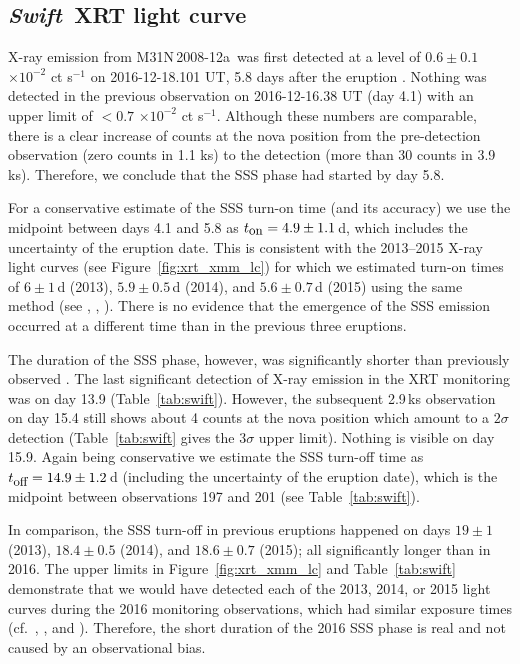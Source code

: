 \documentclass[twocolumn,tighten]{aastex6}
\def\swift{{\it Swift~}}
\def\novak{{M31N\,2008-12a}}
\newcommand{\cts}[1]{$\times 10^{#1}$ ct s$^{-1}$}
\newcommand{\eton}{t_{\mbox{\small{on}}}}
\newcommand{\etoff}{t_{\mbox{\small{off}}}}
\newcommand{\xonek}{\citetalias{2014A&A...563L...8H}}
\newcommand{\xtwok}{\citetalias{2015A&A...580A..46H}}
\newcommand{\othreek}{\citetalias{2016ApJ...833..149D}}
\begin{document}
\subsection{\swift XRT light curve}
\label{sec:xrt_lc}
\smallskip
X-ray emission from \novak\ was first detected at a level of $0.6\pm0.1$\,\cts{-2} on 2016-12-18.101 UT, 5.8 days after the eruption \citep[see Table~\ref{tab:swift} and also][]{2016ATel.9872....1H}. Nothing was detected in the previous observation on 2016-12-16.38 UT (day 4.1) with an upper limit of $<0.7$ \cts{-2}. Although these numbers are comparable, there is a clear increase of counts at the nova position from the pre-detection observation (zero counts in 1.1 ks) to the detection (more than 30 counts in 3.9\,ks). Therefore, we conclude that the SSS phase had started by day 5.8.

For a conservative estimate of the SSS turn-on time (and its accuracy) we use the midpoint between days 4.1 and 5.8 as $\eton = 4.9\pm1.1$\,d, which includes the uncertainty of the eruption date. This is consistent with the 2013--2015 X-ray light curves (see Figure~\ref{fig:xrt_xmm_lc}) for which we estimated turn-on times of $6\pm1$\,d (2013), $5.9\pm0.5$\,d (2014), and $5.6\pm0.7$\,d (2015) using the same method (see \xonek, \xtwok, \othreek). There is no evidence that the emergence of the SSS emission occurred at a different time than in the previous three eruptions.

The duration of the SSS phase, however, was significantly shorter than previously observed \citep[see Figure~\ref{fig:xrt_xmm_lc} and][]{2016ATel.9907....1H}. The last significant detection of X-ray emission in the XRT monitoring was on day 13.9 (Table~\ref{tab:swift}). However, the subsequent 2.9\,ks observation on day 15.4 still shows about 4 counts at the nova position which amount to a $2\sigma$ detection (Table~\ref{tab:swift} gives the $3\sigma$ upper limit). Nothing is visible on day 15.9. Again being conservative we estimate the SSS turn-off time as $\etoff = 14.9\pm1.2$\,d (including the uncertainty of the eruption date), which is the midpoint between observations 197 and 201 (see Table~\ref{tab:swift}).

In comparison, the SSS turn-off in previous eruptions happened on days $19\pm1$ (2013), $18.4\pm0.5$ (2014), and $18.6\pm0.7$ (2015); all significantly longer than in 2016. The upper limits in Figure~\ref{fig:xrt_xmm_lc} and Table~\ref{tab:swift} demonstrate that we would have detected each of the 2013, 2014, or 2015 light curves during the 2016 monitoring observations, which had similar exposure times (cf.\ \xonek, \xtwok, and \othreek). Therefore, the short duration of the 2016 SSS phase is real and not caused by an observational bias.
\end{document}
